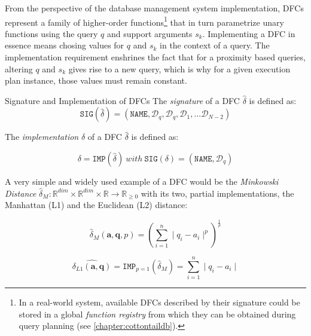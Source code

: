 From the perspective of the database management system implementation, DFCs represent a family of higher-order functions\footnote{In a real-world system, available DFCs described by their signature could be stored in a global \emph{function registry} from which they can be obtained during query planning (see \cref{chapter:cottontaildb}).} that in turn parametrize unary functions using the query $q$ and support arguments $s_k$. Implementing a DFC in essence means chosing values for $q$ and $s_k$ in the context of a query. The implementation requirement enshrines the fact that for a proximity based queries, altering $q$ and $s_k$ gives rise to a new query, which is why for a given execution plan instance, those values must remain constant.

\begin{definition}[label=definition:dfc_sig_imp]{Signature and Implementation of DFCs}{}    
    The \emph{signature} of a DFC $\hat{\delta}$ is defined as:
    \begin{equation}
        \label{equation:dfc_signature}
        \texttt{SIG}(\hat{\delta}) = (\mathtt{NAME}, \mathcal{D}_q, \mathcal{D}_q, \mathcal{D}_1,... \mathcal{D}_{N-2})
    \end{equation}

    The \emph{implementation} $\delta$ of a DFC $\hat{\delta}$ is defined as:

    \begin{equation}
        \label{equation:dfc_implementation}
        \delta = \texttt{IMP}(\hat{\delta}) \: with \: \texttt{SIG}(\delta) = (\mathtt{NAME}, \mathcal{D}_q)
    \end{equation}
\end{definition}

A very simple and widely used example of a DFC would be the \emph{Minkowski Distance} $\hat{\delta}_{M} \colon \mathbb{R}^{dim} \times \mathbb{R}^{dim} \times \mathbb{R} \to \mathbb{R}_{\geq 0}$ with its two, partial implementations, the Manhattan (L1) and the Euclidean (L2) distance:

\begin{equation}
    \hat{\delta}_{M}(\mathbf{a},\mathbf{q},p) = \left(\sum_{i=1}^{n} \mid q_i - a_i \mid^p\right)^{\frac{1}{p}}
\end{equation}

\begin{equation}
    \hat{\delta_{L1}(\mathbf{a},\mathbf{q})} = \texttt{IMP}_{p=1}(\hat{\delta}_M) = \sum_{i=1}^{n} \mid q_i - a_i \mid
\end{equation}

